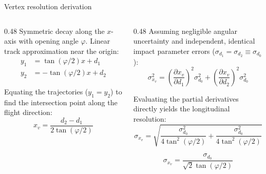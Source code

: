 \documentclass{beamer}
\begin{document}
\begin{frame}[noframenumbering]{Vertex resolution derivation}
    
    \footnotesize
    
    \begin{columns}[T]
        \begin{column}{0.48\textwidth}
            Symmetric decay along the $x$-axis with opening angle $\varphi$. Linear track approximation near the origin:
            \begin{align*}
                y_1 &= \tan(\varphi/2) x + d_1 \\
                y_2 &= -\tan(\varphi/2) x + d_2
            \end{align*}
            
            \vspace{0.4cm}
            
            Equating the trajectories ($y_1 = y_2$) to find the intersection point along the flight direction:
            \begin{equation*}
                x_v = \frac{d_2 - d_1}{2\tan(\varphi/2)}
            \end{equation*}
        \end{column}
        
        \begin{column}{0.48\textwidth}
            Assuming negligible angular uncertainty and independent, identical impact parameter errors ($\sigma_{d_1} = \sigma_{d_2} \equiv \sigma_{d_0}$):
            \begin{equation*}
                \sigma_{x_v}^2 = \left(\frac{\partial x_v}{\partial d_1}\right)^2 \sigma_{d_0}^2 + \left(\frac{\partial x_v}{\partial d_2}\right)^2 \sigma_{d_0}^2
            \end{equation*}
            
            \vspace{0.2cm}
            
            Evaluating the partial derivatives directly yields the longitudinal resolution:
            \begin{equation*}
                \sigma_{x_v} = \sqrt{ \frac{\sigma_{d_0}^2}{4\tan^2(\varphi/2)} + \frac{\sigma_{d_0}^2}{4\tan^2(\varphi/2)} }
            \end{equation*}
            
            \vspace{-0.2cm} %
            \begin{equation*}
                \sigma_{x_v} = \frac{\sigma_{d_0}}{\sqrt{2}\tan(\varphi/2)}
            \end{equation*}
        \end{column}
    \end{columns}

\end{frame}
\end{document}
